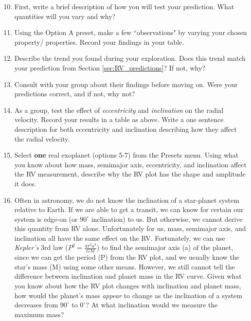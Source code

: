 \documentclass[11pt]{article}
\begin{document}
\begin{enumerate}
\setcounter{enumi}{9}
    \item First, write a brief description of how you will test your prediction.  What quantities will you vary and why?
    \item Using the Option A preset, make a few ``observations" by varying your chosen property/ properties.  Record your findings in your table.
    \item Describe the trend you found during your exploration. Does this trend match your prediction from Section \ref{sec:RV_predictions}?  If not, why?

    \item Consult with your group about their findings before moving on.  Were your predictions correct, and if not, why not?
    
    \item As a group, test the effect of \textit{eccentricity} and \textit{inclination} on the radial velocity.  Record your results in a table as above.  Write a one sentence description for both eccentricity and inclination describing how they affect the radial velocity.
    
    \item Select \textbf{one} real exoplanet (options 5-7) from the Presets menu.  Using what you know about how mass, semimajor axis, eccentricity, and inclination affect the RV measurement, describe why the RV plot has the shape and amplitude it does.
    
    \item Often in astronomy, we do not know the inclination of a star-planet system relative to Earth.  If we are able to get a transit, we can know for certain our system is edge-on (or $90^\circ$ inclination) to us. But otherwise, we cannot derive this quantity from RV alone. Unfortunately for us, mass, semimajor axis, and inclination all have the same effect on the RV. Fortunately, we can use \textit{Kepler's} 3rd law ($P^2 =\frac{ 4\pi^2a^3}{GM}$) to find the semimajor axis (a) of the planet, since we can get the period (P) from the RV plot, and we usually know the star's mass (M) using some other means.  However, we still cannot tell the difference between inclination and planet mass in the RV curve. Given what you know about how the RV plot changes with inclination and planet mass, how would the planet's mass \textit{appear} to change as the inclination of a system decreases from $90^\circ$ to $0^\circ$? At what inclination would we measure the maximum mass?
\end{enumerate}
\end{document}
